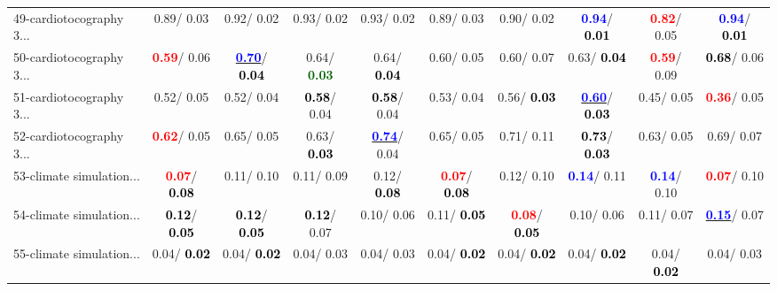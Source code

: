 \begin{table}[h]
\begin{center}
{\begin{tabular}{lc|c|c|c|c|c|c|c|c}
49-cardiotocography 3... &   0.89/  0.03 &   0.92/  0.02 &   0.93/  0.02 &   0.93/  0.02 &   0.89/  0.03 &   0.90/  0.02 & \textcolor{blue}{\textbf{  0.94}}/\textcolor{black}{\textbf{  0.01}} & \textcolor{red}{\textbf{  0.82}}/  0.05 & \textcolor{blue}{\textbf{  0.94}}/\textcolor{black}{\textbf{  0.01}} \\
50-cardiotocography 3... & \textcolor{red}{\textbf{  0.59}}/  0.06 & \underline{\textcolor{blue}{\textbf{  0.70}}}/\textcolor{black}{\textbf{  0.04}} &   0.64/\textcolor{darkgreen}{\textbf{  0.03}} &   0.64/\textcolor{black}{\textbf{  0.04}} &   0.60/  0.05 &   0.60/  0.07 &   0.63/\textcolor{black}{\textbf{  0.04}} & \textcolor{red}{\textbf{  0.59}}/  0.09 & \textcolor{black}{\textbf{  0.68}}/  0.06 \\
51-cardiotocography 3... &   0.52/  0.05 &   0.52/  0.04 & \textcolor{black}{\textbf{  0.58}}/  0.04 & \textcolor{black}{\textbf{  0.58}}/  0.04 &   0.53/  0.04 &   0.56/\textcolor{black}{\textbf{  0.03}} & \underline{\textcolor{blue}{\textbf{  0.60}}}/\textcolor{black}{\textbf{  0.03}} &   0.45/  0.05 & \textcolor{red}{\textbf{  0.36}}/  0.05 \\
52-cardiotocography 3... & \textcolor{red}{\textbf{  0.62}}/  0.05 &   0.65/  0.05 &   0.63/\textcolor{black}{\textbf{  0.03}} & \underline{\textcolor{blue}{\textbf{  0.74}}}/  0.04 &   0.65/  0.05 &   0.71/  0.11 & \textcolor{black}{\textbf{  0.73}}/\textcolor{black}{\textbf{  0.03}} &   0.63/  0.05 &   0.69/  0.07 \\
53-climate simulation... & \textcolor{red}{\textbf{  0.07}}/\textcolor{black}{\textbf{  0.08}} &   0.11/  0.10 &   0.11/  0.09 &   0.12/\textcolor{black}{\textbf{  0.08}} & \textcolor{red}{\textbf{  0.07}}/\textcolor{black}{\textbf{  0.08}} &   0.12/  0.10 & \textcolor{blue}{\textbf{  0.14}}/  0.11 & \textcolor{blue}{\textbf{  0.14}}/  0.10 & \textcolor{red}{\textbf{  0.07}}/  0.10 \\ \hline
54-climate simulation... & \textcolor{black}{\textbf{  0.12}}/\textcolor{black}{\textbf{  0.05}} & \textcolor{black}{\textbf{  0.12}}/\textcolor{black}{\textbf{  0.05}} & \textcolor{black}{\textbf{  0.12}}/  0.07 &   0.10/  0.06 &   0.11/\textcolor{black}{\textbf{  0.05}} & \textcolor{red}{\textbf{  0.08}}/\textcolor{black}{\textbf{  0.05}} &   0.10/  0.06 &   0.11/  0.07 & \underline{\textcolor{blue}{\textbf{  0.15}}}/  0.07 \\
55-climate simulation... &   0.04/\textcolor{black}{\textbf{  0.02}} &   0.04/\textcolor{black}{\textbf{  0.02}} &   0.04/  0.03 &   0.04/  0.03 &   0.04/\textcolor{black}{\textbf{  0.02}} &   0.04/\textcolor{black}{\textbf{  0.02}} &   0.04/\textcolor{black}{\textbf{  0.02}} &   0.04/\textcolor{black}{\textbf{  0.02}} &   0.04/  0.03 \\

\end{tabular}}
\end{center}
\end{table}

